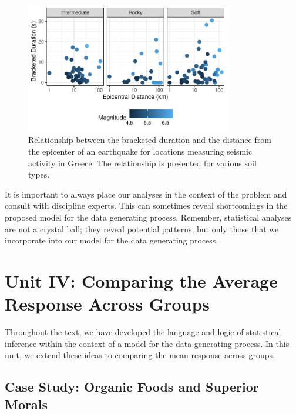 \documentclass[
  letterpaper,
  DIV=11,
  numbers=noendperiod]{scrreprt}
\theoremstyle{definition}
\theoremstyle{definition}
\theoremstyle{plain}
\theoremstyle{remark}
\begin{document}
\begin{figure}

{\centering \includegraphics[width=0.8\textwidth,height=\textheight]{./images/fig-regrecap-multivariable-1.pdf}

}

\caption{\label{fig-regrecap-multivariable}Relationship between the
bracketed duration and the distance from the epicenter of an earthquake
for locations measuring seismic activity in Greece. The relationship is
presented for various soil types.}

\end{figure}

It is important to always place our analyses in the context of the
problem and consult with discipline experts. This can sometimes reveal
shortcomings in the proposed model for the data generating process.
Remember, statistical analyses are not a crystal ball; they reveal
potential patterns, but only those that we incorporate into our model
for the data generating process.

\part{Unit IV: Comparing the Average Response Across Groups}

Throughout the text, we have developed the language and logic of
statistical inference within the context of a model for the data
generating process. In this unit, we extend these ideas to comparing the
mean response across groups.

\hypertarget{sec-caseorganic}{%
\chapter{Case Study: Organic Foods and Superior
Morals}\label{sec-caseorganic}}
\end{document}
